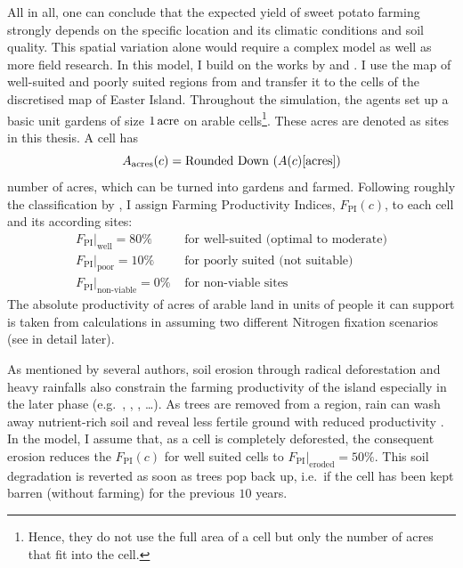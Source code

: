 All in all, one can conclude that the expected yield of sweet potato farming strongly depends on the specific location and its climatic conditions and soil quality.
This spatial variation alone would require a complex model as well as more field research.
In this model, I build on the works by \citep{Puleston2017} and \citet{Louwagie2006}.
I use the map of well-suited and poorly suited regions from \citet{Puleston2017} and transfer it to the cells of the discretised map of Easter Island.
Throughout the simulation, the agents set up a basic unit gardens of size $1\, {\rm acre}$ on arable cells\footnote{Hence, they do not use the full area of a cell but only the number of acres that fit into the cell.}.
These acres are denoted as sites in this thesis. 
A cell has 
\begin{equation}
A_{\rm acres}(c) = \text{Rounded Down }(A(c)[\text{acres}])
\end{equation}
number of acres, which can be turned into gardens and farmed.
Following roughly the classification by \citet{Louwagie2006}, I assign Farming Productivity Indices, $F_\text{PI}(c)$, to each cell and its according sites:
\begin{eqnarray*}
F_\text{PI}|_\text{well} = 80\% & \text{ for well-suited (optimal to moderate)}\\
F_\text{PI}|_\text{poor} = 10\%  & \text{ for poorly suited (not suitable)}\\
F_\text{PI}|_\text{non-viable} = 0\% & \text{ for non-viable sites}
\end{eqnarray*}
The absolute productivity of acres of arable land in units of people it can support is taken from calculations in \citet{Puleston2017} assuming two different Nitrogen fixation scenarios (see in detail later).

As mentioned by several authors, soil erosion through radical deforestation and heavy rainfalls also constrain the farming productivity of the island especially in the later phase (e.g.\ \citet{Brander1998}, \citet{Mieth2005}, \citet{Bahn2017}, \ldots).
As trees are removed from a region, rain can wash away nutrient-rich soil and reveal less fertile ground with reduced productivity \citet{Mieth2005}.
In the model, I assume that, as a cell is completely deforested, the consequent erosion reduces the $F_\text{PI}(c)$ for well suited cells to $F_\text{PI}|_\text{eroded}=50\%$. 
This soil degradation is reverted as soon as trees pop back up, i.e.\ if the cell has been kept barren (without farming) for the previous $10$ years.

